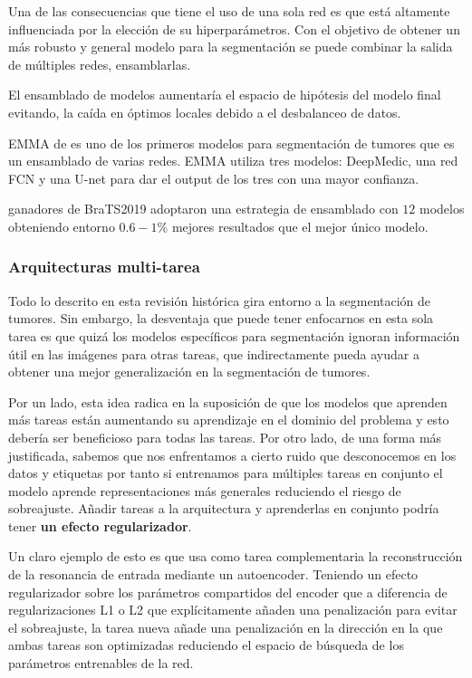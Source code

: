 			Una de las consecuencias que tiene el uso de una sola red es que está altamente influenciada por la elección de su hiperparámetros. Con el objetivo de obtener un más robusto y general modelo para la segmentación se puede combinar la salida de múltiples redes, ensamblarlas.
			
			El ensamblado de modelos aumentaría el espacio de hipótesis del modelo final evitando, la caída en óptimos locales debido a el desbalanceo de datos.
			
			EMMA  de \cite{kamnitsas2018ensembles} es uno de los primeros modelos para segmentación de tumores que es un ensamblado de varias redes. EMMA utiliza tres modelos: DeepMedic, una red FCN y una U-net para dar el output de los tres con una mayor confianza.
			
			\cite{jiang2020two} ganadores de BraTS2019 adoptaron una estrategia de ensamblado con $12$ modelos obteniendo entorno $0.6 - 1 \%$ mejores resultados que el mejor único modelo.
			
			\subsubsection{Arquitecturas multi-tarea}
			
			Todo lo descrito en esta revisión histórica gira entorno a la segmentación de tumores. Sin embargo, la desventaja que puede tener enfocarnos en esta sola tarea es que quizá los modelos específicos para segmentación ignoran información útil en las imágenes para otras tareas, que indirectamente pueda ayudar a obtener una mejor generalización en la segmentación de tumores. 
			
			Por un lado, esta idea radica en la suposición de que los modelos que aprenden más tareas están aumentando su aprendizaje en el dominio del problema y esto debería ser beneficioso para todas las tareas. Por otro lado, de una forma más justificada, sabemos que nos enfrentamos a cierto ruido que desconocemos en los datos y etiquetas por tanto si entrenamos para múltiples tareas en conjunto el modelo aprende representaciones más generales reduciendo el riesgo de sobreajuste. Añadir tareas a la arquitectura y aprenderlas en conjunto podría tener \textbf{un efecto regularizador}.
			
			Un claro ejemplo de esto es \cite{myronenko20193d} que usa como tarea complementaria la reconstrucción de la resonancia de entrada mediante un autoencoder. Teniendo un efecto regularizador sobre los parámetros compartidos del encoder que a diferencia de regularizaciones L1 o L2 que explícitamente añaden una penalización para evitar el sobreajuste, la tarea nueva añade una penalización en la dirección en la que ambas tareas son optimizadas reduciendo el espacio de búsqueda de los parámetros entrenables de la red.
			
